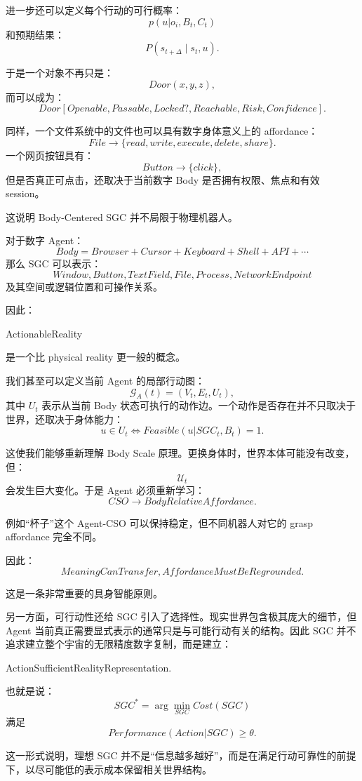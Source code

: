 进一步还可以定义每个行动的可行概率：
\[
p(u|o_i,B_t,C_t)
\]
和预期结果：
\[
P
\left(
s_{t+\Delta}
\mid
s_t,u
\right).
\]

于是一个对象不再只是：
\[
Door(
x,y,z
),
\]
而可以成为：
\[
Door
\left[
Openable,
Passable,
Locked?,
Reachable,
Risk,
Confidence
\right].
\]

同样，一个文件系统中的文件也可以具有数字身体意义上的 affordance：
\[
File
\rightarrow
\{
read,
write,
execute,
delete,
share
\}.
\]
一个网页按钮具有：
\[
Button
\rightarrow
\{
click
\},
\]
但是否真正可点击，还取决于当前数字 Body 是否拥有权限、焦点和有效 session。

这说明 Body-Centered SGC 并不局限于物理机器人。

对于数字 Agent：
\[
Body
=
Browser+Cursor+Keyboard+Shell+API+\cdots
\]
那么 SGC 可以表示：
\[
Window,
Button,
TextField,
File,
Process,
NetworkEndpoint
\]
及其空间或逻辑位置和可操作关系。

因此：
\begin{statementbox}
ActionableReality
\end{statementbox}
是一个比 physical reality 更一般的概念。

我们甚至可以定义当前 Agent 的局部行动图：
\[
\mathcal G_A(t)
=
(V_t,E_t,U_t),
\]
其中 \(U_t\) 表示从当前 Body 状态可执行的动作边。一个动作是否存在并不只取决于世界，还取决于身体能力：
\[
u\in U_t
\iff
Feasible(u|SGC_t,B_t)=1.
\]

这使我们能够重新理解 Body Scale 原理。更换身体时，世界本体可能没有改变，但：
\[
\mathcal U_t
\]
会发生巨大变化。于是 Agent 必须重新学习：
\[
CSO
\rightarrow
BodyRelativeAffordance.
\]

例如“杯子”这个 Agent-CSO 可以保持稳定，但不同机器人对它的 grasp affordance 完全不同。

因此：
\[
\boxed{
MeaningCanTransfer,
AffordanceMustBeRegrounded.
}
\]

这是一条非常重要的具身智能原则。

另一方面，可行动性还给 SGC 引入了选择性。现实世界包含极其庞大的细节，但 Agent 当前真正需要显式表示的通常只是与可能行动有关的结构。因此 SGC 并不追求建立整个宇宙的无限精度数字复制，而是建立：
\begin{statementbox}
ActionSufficientRealityRepresentation.
\end{statementbox}

也就是说：
\[
SGC^\ast
=
\arg\min_{SGC}
Cost(SGC)
\]
满足
\[
Performance(
Action|SGC
)
\geq
\theta.
\]

这一形式说明，理想 SGC 并不是“信息越多越好”，而是在满足行动可靠性的前提下，以尽可能低的表示成本保留相关世界结构。

